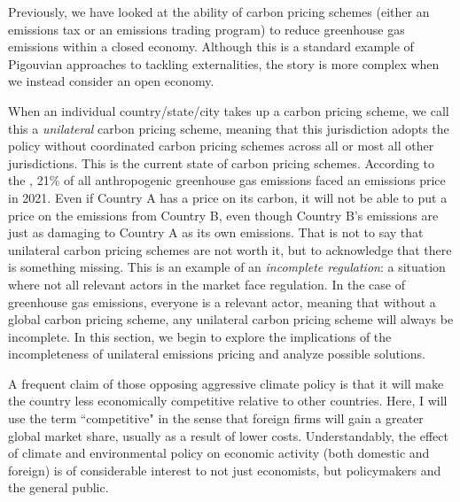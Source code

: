 Previously, we have looked at the ability of carbon pricing schemes (either an emissions tax or an emissions trading program) to reduce greenhouse gas emissions within a closed economy. Although this is a standard example of Pigouvian approaches to tackling externalities, the story is more complex when we instead consider an open economy. 

When an individual country/state/city takes up a carbon pricing scheme, we call this a \emph{unilateral} carbon pricing scheme, meaning that this jurisdiction adopts the policy without coordinated carbon pricing schemes across all or most all other jurisdictions. This is the current state of carbon pricing schemes. According to the \cite{wbank}, 21\% of all anthropogenic greenhouse gas emissions faced an emissions price in 2021. Even if Country A has a price on its carbon, it will not be able to put a price on the emissions from Country B, even though Country B's emissions are just as damaging to Country A as its own emissions. That is not to say that unilateral carbon pricing schemes are not worth it, but to acknowledge that there is something missing. This is an example of an \emph{incomplete regulation}: a situation where not all relevant actors in the market face regulation. In the case of greenhouse gas emissions, everyone is a relevant actor, meaning that without a global carbon pricing scheme, any unilateral carbon pricing scheme will always be incomplete. In this section, we begin to explore the implications of the incompleteness of unilateral emissions pricing and analyze possible solutions.



A frequent claim of those opposing aggressive climate policy is that it will make the country less economically competitive relative to other countries. Here, I will use the term ``competitive" in the sense that foreign firms will gain a greater global market share, usually as a result of lower costs. Understandably, the effect of climate and environmental policy on economic activity (both domestic and foreign) is of considerable interest to not just economists, but policymakers and the general public.

